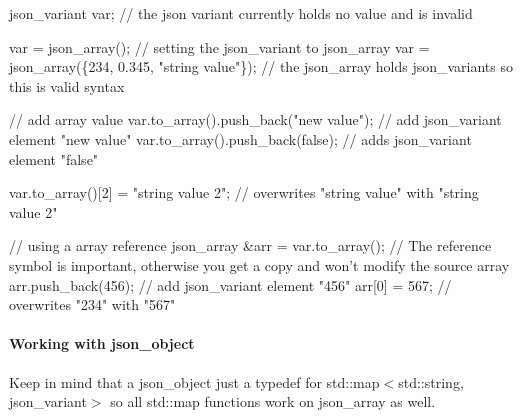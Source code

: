 \begin{DoxyCode}
json\_variant var;                               // the json variant currently holds no value and is invalid

var = json\_array();                             // setting the json\_variant to json\_array
var = json\_array(\{234, 0.345, "string value"\}); // the json\_array holds json\_variants so this is valid
       syntax

// add array value
var.to\_array().push\_back("new value");          // add json\_variant element "new value"
var.to\_array().push\_back(false);                // adds json\_variant element "false"

var.to\_array()[2] = "string value 2";           // overwrites "string value" with "string value 2"

// using a array reference
json\_array &arr = var.to\_array();               // The reference symbol is important, otherwise you get a
       copy and won't modify the source array
arr.push\_back(456);                             // add json\_variant element "456"
arr[0] = 567;                                   // overwrites "234" with "567"
\end{DoxyCode}


\paragraph*{\label{_working_with_json_object_section}%
Working with json\+\_\+object}

Keep in mind that a {\ttfamily json\+\_\+object} just a {\ttfamily typedef} for {\ttfamily std\+::map$<$std\+::string, json\+\_\+variant$>$} so all {\ttfamily std\+::map} functions work on {\ttfamily json\+\_\+array} as well.


